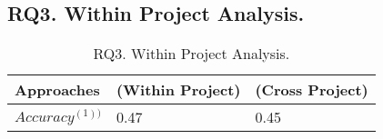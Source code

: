 \subsection{{\bf RQ3. Within Project Analysis.}}

\begin{table}[t]
	\caption{RQ3. Within Project Analysis.}
	\vspace{-0.1in}
	\begin{center}
		\footnotesize
		\tabcolsep 4pt
		\renewcommand{\arraystretch}{1} \begin{tabular}{p{1.4cm}<{\centering}|p{3cm}<{\centering}|p{3cm}<{\centering}}
			
			\hline
			Approaches          & \tool (Within Project) & \tool (Cross Project)\\
			\hline
			$Accuracy^{(1))}$   &      0.47          &		0.45	       \\

			\hline
		\end{tabular}
		\label{RQ3-result}
	\end{center}
\end{table}